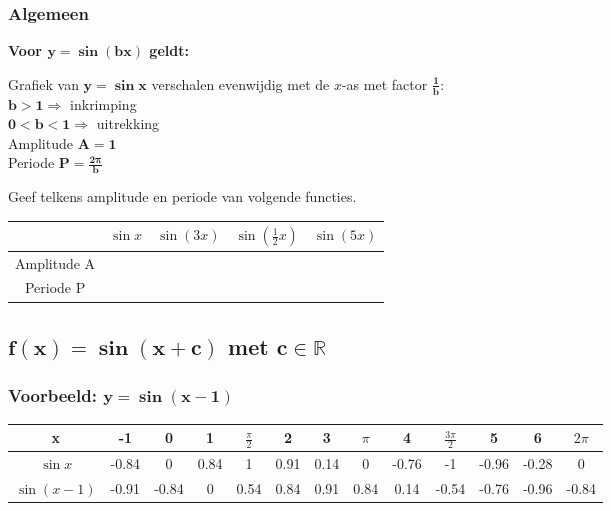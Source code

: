 \documentclass[a4paper,12pt,twoside ]{article}
\begin{document}
\subsubsection{Algemeen}
{\bfseries
Voor $\boldsymbol{y=\sin (bx)}$ geldt:
  \begin{center}
    Grafiek van $\boldsymbol{y=\sin x}$ verschalen evenwijdig met de $x$-as met factor $\boldsymbol{\frac{1}{b}}$:\\
    $\boldsymbol{b>1 \Rightarrow}$ inkrimping\\
    $\boldsymbol{0<b<1 \Rightarrow}$ uitrekking \\
    Amplitude $\boldsymbol{A = 1}$\\
    Periode $\boldsymbol{P = \frac{2\pi}{b}}$
  \end{center}
  }

\begin{oefening}
Geef telkens amplitude en periode van volgende functies.
\begin{center}
  \begin{tabular}{c|c|c|c|c}
     & $\sin x$ & $\sin (3x)$ &$\sin (\frac{1}{2}x)$ & $\sin (5x)$\\
    \hline
    Amplitude A &\hspace*{2cm} &\hspace*{2cm}&\hspace*{2cm}&\hspace*{2cm}
    \\
    \hline
    Periode P &\hspace*{2cm}&\hspace*{2cm}&\hspace*{2cm}&\hspace*{2cm}
  \end{tabular}
\end{center}
\end{oefening}

\subsection{$\boldsymbol{f(x)=\sin (x+c)}$ met $\boldsymbol{c\in \mathbb{R}}$}
\subsubsection{Voorbeeld: $\boldsymbol{y=\sin (x-1)}$}

\begin{adjustwidth}{-2.5cm}{-2.5cm}
\begin{center}
\scriptsize
  \begin{tabular}{c|c|c|c|c|c|c|c|c|c|c|c|c}
    x & -1 & 0 & 1 &  $\frac{\pi}{2}$ & 2 & 3 & $\pi$ & 4 & $\frac{3\pi}{2}$ & 5 & 6 & $2\pi$
    \\
    \hline
   $\sin x$ &-0.84&0&0.84&1&0.91&0.14&0&-0.76&-1&-0.96&-0.28 &0
    \\
    \hline
   $\sin (x-1)$ &-0.91 &-0.84 &0 &0.54 &0.84 &0.91 &0.84 &0.14 &-0.54 &-0.76 &-0.96 &-0.84
  \end{tabular}
\end{center}
\end{adjustwidth}
\end{document}
